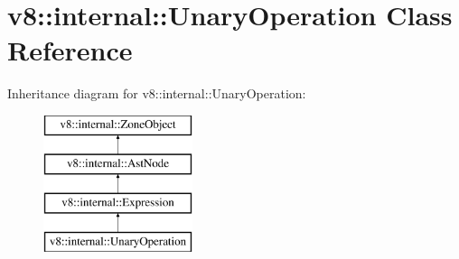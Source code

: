 \hypertarget{classv8_1_1internal_1_1_unary_operation}{}\section{v8\+:\+:internal\+:\+:Unary\+Operation Class Reference}
\label{classv8_1_1internal_1_1_unary_operation}
Inheritance diagram for v8\+:\+:internal\+:\+:Unary\+Operation\+:\begin{figure}[H]
\begin{center}
\leavevmode
\includegraphics[height=4.000000cm]{classv8_1_1internal_1_1_unary_operation}
\end{center}
\end{figure}
